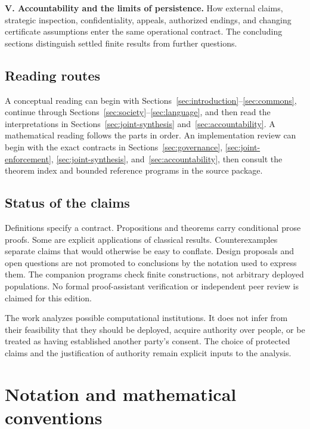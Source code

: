 \documentclass[11pt,letterpaper]{article}
\theoremstyle{plain}
\theoremstyle{definition}
\theoremstyle{remark}
\begin{document}
\noindent\textbf{V. Accountability and the limits of persistence.} How external claims, strategic inspection, confidentiality, appeals, authorized endings, and changing certificate assumptions enter the same operational contract. The concluding sections distinguish settled finite results from further questions.

\subsection*{Reading routes}

A conceptual reading can begin with Sections~\ref{sec:introduction}--\ref{sec:commons}, continue through Sections~\ref{sec:society}--\ref{sec:language}, and then read the interpretations in Sections~\ref{sec:joint-synthesis} and~\ref{sec:accountability}. A mathematical reading follows the parts in order. An implementation review can begin with the exact contracts in Sections~\ref{sec:governance}, \ref{sec:joint-enforcement}, \ref{sec:joint-synthesis}, and~\ref{sec:accountability}, then consult the theorem index and bounded reference programs in the source package.

\subsection*{Status of the claims}

Definitions specify a contract. Propositions and theorems carry conditional prose proofs. Some are explicit applications of classical results. Counterexamples separate claims that would otherwise be easy to conflate. Design proposals and open questions are not promoted to conclusions by the notation used to express them. The companion programs check finite constructions, not arbitrary deployed populations. No formal proof-assistant verification or independent peer review is claimed for this edition.

The work analyzes possible computational institutions. It does not infer from their feasibility that they should be deployed, acquire authority over people, or be treated as having established another party's consent. The choice of protected claims and the justification of authority remain explicit inputs to the analysis.
\clearpage
\section*{Notation and mathematical conventions}
\end{document}
